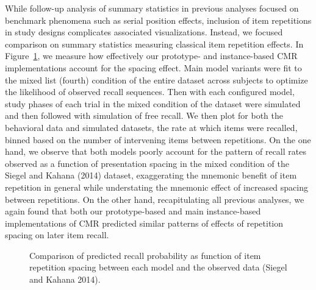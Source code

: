 \documentclass[
  letterpaper,
  DIV=11]{article}
\begin{document}
While follow-up analysis of summary statistics in previous analyses
focused on benchmark phenomena such as serial position effects,
inclusion of item repetitions in study designs complicates associated
visualizations. Instead, we focused comparison on summary statistics
measuring classical item repetition effects. In
Figure~\ref{fig-lohnas_spacing}, we measure how effectively our
prototype- and instance-based CMR implementations account for the
spacing effect. Main model variants were fit to the mixed list (fourth)
condition of the entire dataset across subjects to optimize the
likelihood of observed recall sequences. Then with each configured
model, study phases of each trial in the mixed condition of the dataset
were simulated and then followed with simulation of free recall. We then
plot for both the behavioral data and simulated datasets, the rate at
which items were recalled, binned based on the number of intervening
items between repetitions. On the one hand, we observe that both models
poorly account for the pattern of recall rates observed as a function of
presentation spacing in the mixed condition of the Siegel and Kahana
(2014) dataset, exaggerating the mnemonic benefit of item repetition in
general while understating the mnemonic effect of increased spacing
between repetitions. On the other hand, recapitulating all previous
analyses, we again found that both our prototype-based and main
instance-based implementations of CMR predicted similar patterns of
effects of repetition spacing on later item recall.

\begin{figure}

%
%

\caption{\label{fig-lohnas_spacing}Comparison of predicted recall
probability as function of item repetition spacing between each model
and the observed data (Siegel and Kahana 2014).}

\end{figure}
\end{document}
